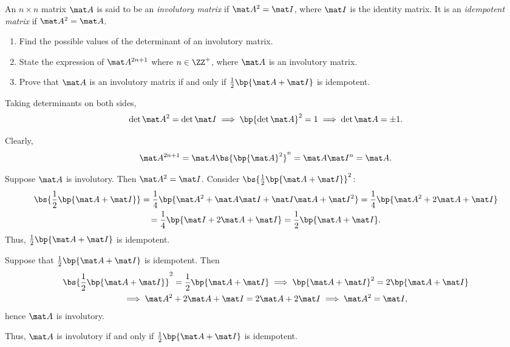 \begin{problem}
    An $n \times n$ matrix $\mat A$ is said to be an \emph{involutory matrix} if $\mat A^2 = \mat I$, where $\mat I$ is the identity matrix. It is an \emph{idempotent matrix} if $\mat A^2 = \mat A$.

    \begin{enumerate}
        \item Find the possible values of the determinant of an involutory matrix.
        \item State the expression of $\mat A^{2n+1}$ where $n \in \ZZ^+$, where $\mat A$ is an involutory matrix.
        \item Prove that $\mat A$ is an involutory matrix if and only if $\frac12 \bp{\mat A + \mat I}$ is idempotent.
    \end{enumerate}
\end{problem}
\begin{solution}
    \begin{ppart}
        Taking determinants on both sides, \[\det \mat A^2 = \det \mat I \implies \bp{\det \mat A}^2 = 1 \implies \det \mat A = \pm 1.\]
    \end{ppart}
    \begin{ppart}
        Clearly, \[\mat A^{2n+1} = \mat A \bs{\bp{\mat A}^{2}}^{n} = \mat A \mat I^n = \mat A.\]
    \end{ppart}
    \begin{ppart}
        Suppose $\mat A$ is involutory. Then $\mat A^2 = \mat I$. Consider $\bs{\frac12 \bp{\mat A + \mat I}}^2$:
        \begin{gather*}
            \bs{\frac12 \bp{\mat A + \mat I}} = \frac14 \bp{\mat A^2 + \mat A \mat I + \mat I \mat A + \mat I^2} = \frac14 \bp{\mat A^2 + 2\mat A + \mat I}\\
            = \frac14 \bp{\mat I + 2\mat A + \mat I} = \frac12 \bp{\mat A + \mat I}.    
        \end{gather*}
        Thus, $\frac12\bp{\mat A + \mat I}$ is idempotent.

        Suppose that $\frac12 \bp{\mat A + \mat I}$ is idempotent. Then
        \begin{gather*}
            \bs{\frac12 \bp{\mat A + \mat I}}^2 = \frac12 \bp{\mat A + \mat I} \implies \bp{\mat A + \mat I}^2 = 2 \bp{\mat A + \mat I} \\
            \implies \mat A^2 + 2\mat A + \mat I = 2\mat A + 2 \mat I \implies \mat A^2 = \mat I,
        \end{gather*}
        hence $\mat A$ is involutory.

        Thus, $\mat A$ is involutory if and only if $\frac12\bp{\mat A + \mat I}$ is idempotent.
    \end{ppart}
\end{solution}

